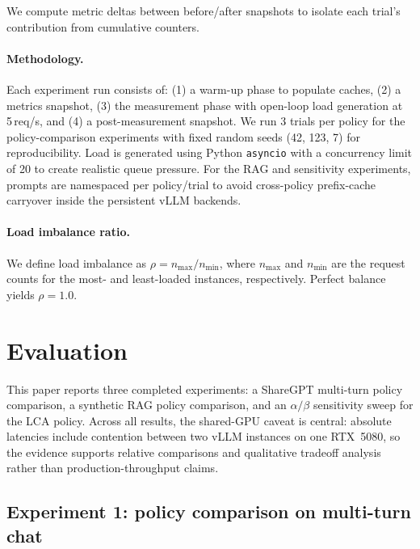 \documentclass{article}
\begin{document}
We compute metric deltas between before/after snapshots to isolate each trial's contribution from cumulative counters.

\paragraph{Methodology.} Each experiment run consists of: (1) a warm-up phase to populate caches, (2) a metrics snapshot, (3) the measurement phase with open-loop load generation at 5\,req/s, and (4) a post-measurement snapshot. We run 3 trials per policy for the policy-comparison experiments with fixed random seeds (42, 123, 7) for reproducibility. Load is generated using Python \texttt{asyncio} with a concurrency limit of 20 to create realistic queue pressure. For the RAG and sensitivity experiments, prompts are namespaced per policy/trial to avoid cross-policy prefix-cache carryover inside the persistent vLLM backends.

\paragraph{Load imbalance ratio.} We define load imbalance as $\rho = n_{\max} / n_{\min}$, where $n_{\max}$ and $n_{\min}$ are the request counts for the most- and least-loaded instances, respectively. Perfect balance yields $\rho = 1.0$.

\section{Evaluation}
\label{sec:eval}

This paper reports three completed experiments: a ShareGPT multi-turn policy comparison, a synthetic RAG policy comparison, and an $\alpha/\beta$ sensitivity sweep for the LCA policy. Across all results, the shared-GPU caveat is central: absolute latencies include contention between two vLLM instances on one RTX~5080, so the evidence supports relative comparisons and qualitative tradeoff analysis rather than production-throughput claims.

\subsection{Experiment 1: policy comparison on multi-turn chat}
\label{sec:eval_sharegpt}
\end{document}
